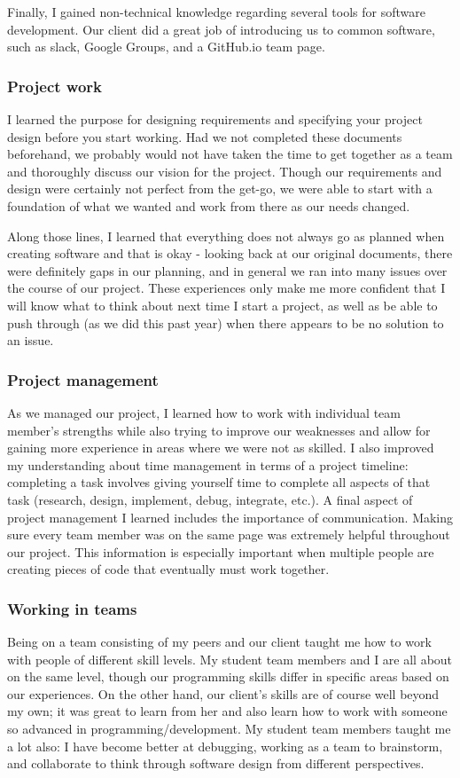 \documentclass[onecolumn, draftclsnofoot,10pt, compsoc]{IEEEtran}
\begin{document}
\begin{flushleft}
Finally, I gained non-technical knowledge regarding several tools for software development. Our client did a great job of introducing us to common software, such as slack, Google Groups, and a GitHub.io team page.
 
\subsubsection{Project work}
I learned the purpose for designing requirements and specifying your project design before you start working. Had we not completed these documents beforehand, we probably would not have taken the time to get together as a team and thoroughly discuss our vision for the project. Though our requirements and design were certainly not perfect from the get-go, we were able to start with a foundation of what we wanted and work from there as our needs changed.
 
Along those lines, I learned that everything does not always go as planned when creating software and that is okay - looking back at our original documents, there were definitely gaps in our planning, and in general we ran into many issues over the course of our project. These experiences only make me more confident that I will know what to think about next time I start a project, as well as be able to push through (as we did this past year) when there appears to be no solution to an issue.
 
\subsubsection{Project management}
As we managed our project, I learned how to work with individual team member's strengths while also trying to improve our weaknesses and allow for gaining more experience in areas where we were not as skilled. I also improved my understanding about time management in terms of a project timeline: completing a task involves giving yourself time to complete all aspects of that task (research, design, implement, debug, integrate, etc.). A final aspect of project management I learned includes the importance of communication. Making sure every team member was on the same page was extremely helpful throughout our project. This information is especially important when multiple people are creating pieces of code that eventually must work together.
 
\subsubsection{Working in teams}
Being on a team consisting of my peers and our client taught me how to work with people of different skill levels. My student team members and I are all about on the same level, though our programming skills differ in specific areas based on our experiences. On the other hand, our client's skills are of course well beyond my own; it was great to learn from her and also learn how to work with someone so advanced in programming/development. My student team members taught me a lot also: I have become better at debugging, working as a team to brainstorm, and collaborate to think through software design from different perspectives.
 

\end{flushleft}
\end{document}
